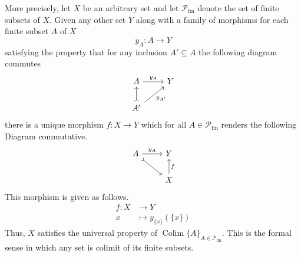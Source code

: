 \documentclass[12pt]{article}
\theoremstyle{plain}
\theoremstyle{definition}
\newcommand{\call}[1]{\mathcal{#1}}
\newcommand{\lto}{\longrightarrow}
\begin{document}
	More precisely, let $X$ be an arbitrary set and let $\call{P}_{\text{fin}}$ denote the set of finite subsets of $X$. Given any other set $Y$ along with a family of morphisms for each finite subset $A$ of $X$
	\begin{equation}
		y_{A}: A \lto Y
		\end{equation}
	satisfying the property that for any inclusion $A' \subseteq A$ the following diagram commutes
	\begin{equation}
		\begin{tikzcd}
			A\arrow[r,"{y_{A}}"] & Y\\
			A'\arrow[u,rightarrowtail]\arrow[ur, swap,"{y_{A'}}"]
			\end{tikzcd}
		\end{equation}
	there is a unique morphism $f: X \lto Y$ which for all $A \in \call{P}_{\text{fin}}$ renders the following Diagram commutative.
	\begin{equation}
		\begin{tikzcd}
			A\arrow[r,"{y_A}"]\arrow[dr,rightarrowtail] & Y\\
			& X\arrow[u,swap,"{f}"]
		\end{tikzcd}
	\end{equation}
This morphism is given as follows.
	\begin{align*}
		f: X &\lto Y\\
		x &\longmapsto y_{\{ x\}}(\{ x\})
		\end{align*}
	Thus, $X$ satisfies the universal property of $\operatorname{Colim}\{ A \}_{A \in \call{P}_{\text{fin}}}$. This is the formal sense in which any set is colimit of its finite subsets.
	
\end{document}
